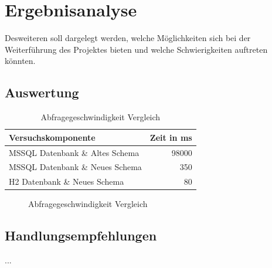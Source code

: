 
\chapter{Ergebnisanalyse}

Desweiteren soll dargelegt werden, welche Möglichkeiten sich bei der Weiterführung des Projektes bieten und welche Schwierigkeiten auftreten könnten.

\section{Auswertung}


\begin{table}[htbp]
\centering
\label{table:vergleich_abfragegeschwindigkeit}
\begin{tabular} {l | r}
Versuchskomponente & Zeit in ms  \\ \hline
MSSQL Datenbank \& Altes Schema & 98000 \\
MSSQL Datenbank \& Neues Schema & 350 \\
H2 Datenbank \& Neues Schema & 80 \\
\end{tabular}
\caption{Abfragegeschwindigkeit Vergleich}
\end{table}


\begin{figure}[htbp]
\centering
{}\hfill
{}\hfill
{}
\caption{Abfragegeschwindigkeit Vergleich}
\label{ergebniss_vergleich}
\end{figure}


\section{Handlungsempfehlungen}

...
